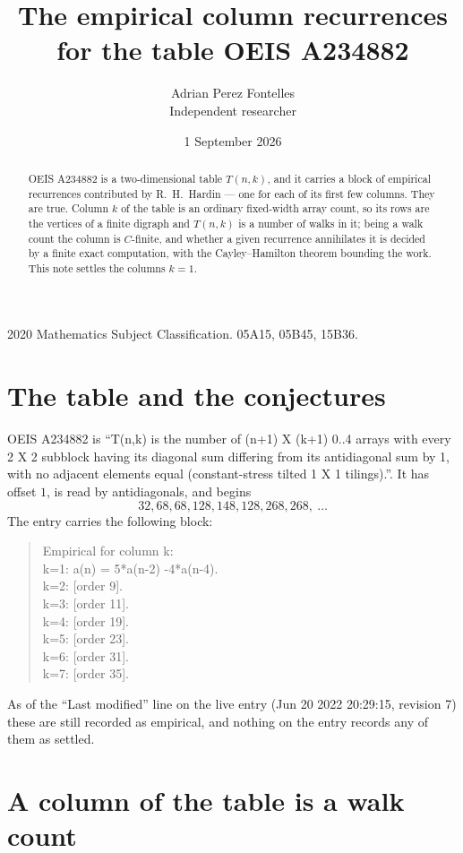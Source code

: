 \documentclass[11pt,a4paper]{article}
\title{The empirical column recurrences for the table OEIS A234882}
\author{Adrian Perez Fontelles\\ \small Independent researcher}
\date{1 September 2026}
\theoremstyle{plain}
\theoremstyle{definition}
\begin{document}
\maketitle

\begin{abstract}
OEIS A234882 is a two-dimensional table $T(n,k)$, and it carries a block of empirical
recurrences contributed by R.~H.~Hardin --- one for each of its first few columns. They are
true. Column $k$ of the table is an ordinary fixed-width array count, so its rows are the
vertices of a finite digraph and $T(n,k)$ is a number of walks in it; being a walk count the
column is $C$-finite, and whether a given recurrence annihilates it is decided by a finite
exact computation, with the Cayley--Hamilton theorem bounding the work. This note settles the
columns $k=1$.
\end{abstract}

\noindent\small 2020 Mathematics Subject Classification. 05A15, 05B45, 15B36.\normalsize

\section{The table and the conjectures}

OEIS A234882 is ``T(n,k) is the number of (n+1) X (k+1) 0..4 arrays with every 2 X 2 subblock having its diagonal sum differing from its antidiagonal sum by 1, with no adjacent elements equal (constant-stress tilted 1 X 1 tilings).''. It has offset $1$, is
read by antidiagonals, and begins
\[
32, 68, 68, 128, 148, 128, 268, 268,\ \dots
\]
The entry carries the following block:
\begin{quote}\small
Empirical for column k:\\
k=1: a(n) = 5*a(n-2) -4*a(n-4).\\
k=2: [order 9].\\
k=3: [order 11].\\
k=4: [order 19].\\
k=5: [order 23].\\
k=6: [order 31].\\
k=7: [order 35].\\
\end{quote}
As of the ``Last modified'' line on the live entry (Jun 20 2022 20:29:15, revision 7) these are still
recorded as empirical, and nothing on the entry records any of them as settled.

\section{A column of the table is a walk count}
\end{document}
